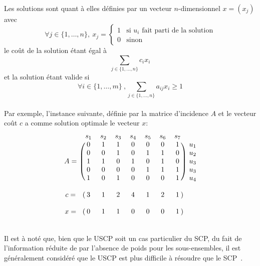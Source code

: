 \documentclass[a4paper,11pt,twoside,french,report]{../common/simplem}
\begin{document}
				\paragraph*{}
					Les solutions sont quant à elles définies par un vecteur \(n\)-dimensionnel \(x = \left(x_j\right)\) avec
					\[\forall j \in \{1,\ldots,n\},\ x_j = \left\{
						\begin{array}{ll}
							1 & \text{si } u_i \text{ fait parti de la solution}\\
							0 & \text{sinon}
						\end{array}
					\right.\]
					le coût de la solution étant égal à
					\[\sum_{j \in \{1,\ldots,n\}}{c_i x_i}\]
					et la solution étant valide si
					\[\forall i \in \{1,\ldots,m\}\ ,\sum_{j \in \{1,\ldots,n\}}{a_{ij}x_i} \ge 1\]
				\paragraph*{}
					Par exemple, l'instance suivante, définie par la matrice d'incidence \(A\) et le vecteur coût \(c\) a comme solution optimale le vecteur \(x\):
					\[
					\begin{blockarray}{ccccccccc}
						& s_1 & s_2 & s_3 & s_4 & s_5 & s_6 & s_7 \\
						\begin{block}{c(ccccccc)c}
							    & 0 & 1 & 1 & 0 & 0 & 0 & 1 & u_1\\
							    & 0 & 0 & 1 & 0 & 1 & 1 & 0 & u_2\\
							A = & 1 & 1 & 0 & 1 & 0 & 1 & 0 & u_3\\
							    & 0 & 0 & 0 & 0 & 1 & 1 & 1 & u_3\\
							    & 1 & 0 & 1 & 0 & 0 & 0 & 1 & u_4\\
						\end{block}
						\\
						\begin{block}{c(ccccccc)c}
							c = & 3 & 1 & 2 & 4 & 1 & 2 & 1 &\\
						\end{block}
						\\
						\begin{block}{c(ccccccc)c}
							x = & 0 & 1 & 1 & 0 & 0 & 0 & 1 &\\
						\end{block}
					\end{blockarray}
					\]
				\paragraph*{}
					Il est à noté que, bien que le \gls{USCP} soit un cas particulier du \gls{SCP}, du fait de l'information réduite de par l’absence de poids pour les sous-ensembles, il est généralement considéré que le \gls{USCP} est plus difficile à résoudre que le \gls{SCP}~\cite{Yelbay2015}.
\end{document}
